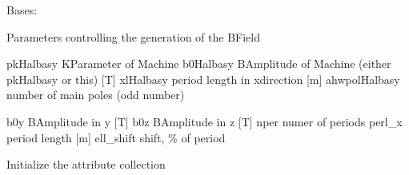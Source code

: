 \documentclass[letterpaper,10pt,english]{sphinxmanual}
\begin{document}
\begin{fulllineitems}
\label{\detokenize{autoapi/unduwave/index:unduwave.undu_paras}}
\pysigstartsignatures
{}
\pysigstopsignatures
\sphinxAtStartPar
Bases: {\hyperref[\detokenize{autoapi/unduwave/attribute_classes/attributes/index:unduwave.attribute_classes.attributes._attribute_collection}]{}}

\sphinxAtStartPar
Parameters controlling the generation of the B\sphinxhyphen{}Field
\begin{description}
\sphinxAtStartPar
pkHalbasy \sphinxhyphen{} K\sphinxhyphen{}Parameter of Machine
b0Halbasy \sphinxhyphen{} B\sphinxhyphen{}Amplitude of Machine (either pkHalbasy or this) {[}T{]}
xlHalbasy\sphinxhyphen{} period length in x\sphinxhyphen{}direction {[}m{]}
ahwpolHalbasy \sphinxhyphen{} number of main poles (odd number)

\sphinxAtStartPar
b0y \sphinxhyphen{} B\sphinxhyphen{}Amplitude in y \sphinxhyphen{} {[}T{]}
b0z \sphinxhyphen{} B\sphinxhyphen{}Amplitude in z \sphinxhyphen{} {[}T{]}
nper\sphinxhyphen{} numer of periods
perl\_x \sphinxhyphen{} period length \sphinxhyphen{} {[}m{]}
ell\_shift \sphinxhyphen{} shift, \% of period

\end{description}

\sphinxAtStartPar
Initialize the attribute collection

\begin{fulllineitems}
\label{\detokenize{autoapi/unduwave/index:unduwave.undu_paras.pkHalbasy}}
\pysigstartsignatures
{}
\pysigstopsignatures
\end{fulllineitems}


\begin{fulllineitems}
\label{\detokenize{autoapi/unduwave/index:unduwave.undu_paras.b0Halbasy}}
\pysigstartsignatures
{}
\pysigstopsignatures
\end{fulllineitems}


\end{fulllineitems}
\end{document}

